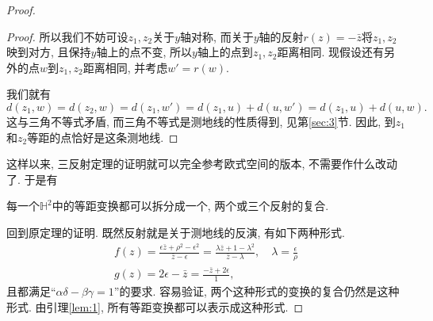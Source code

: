 \documentclass[./main.tex]{subfiles}
\begin{document}
\begin{proof}
\begin{proof}
    所以我们不妨可设\(z_1,z_2\)关于\(y\)轴对称, 而关于\(y\)轴的反射\(r(z)=-\bar z\)将\(z_1,z_2\)映到对方, 且保持\(y\)轴上的点不变, 所以\(y\)轴上的点到\(z_1,z_2\)距离相同. 现假设还有另外的点\(w\)到\(z_1,z_2\)距离相同, 并考虑\(w'=r(w)\).
    \begin{figure}[!ht]
        \centering
    \end{figure}

    我们就有
    \[
        d(z_1,w)=d(z_2,w)=d(z_1,w')=d(z_1,u)+d(u,w')=d(z_1,u)+d(u,w).
    \]
    这与三角不等式矛盾, 而三角不等式是测地线的性质得到, 见第\ref{sec:3}节. 因此, 到\(z_1\)和\(z_2\)等距的点恰好是这条测地线.
\end{proof}
这样以来, 三反射定理的证明就可以完全参考欧式空间的版本, 不需要作什么改动了. 于是有
\begin{lemma}\label{lem:1}
    每一个\(\mathbb{H}^2\)中的等距变换都可以拆分成一个, 两个或三个反射的复合.
\end{lemma}
回到原定理的证明. 既然反射就是关于测地线的反演, 有如下两种形式.
\begin{gather*}
    f(z)=\frac{\epsilon\bar z+\rho^2-\epsilon^2}{\bar z-\epsilon}=\frac{\lambda\bar z+1-\lambda^2}{\bar z-\lambda},\quad\lambda=\frac{\epsilon}{\rho}\\
    g(z)=2\epsilon-\bar z=\frac{-\bar z+2\epsilon}{1},
\end{gather*}
且都满足``\(\alpha\delta-\beta\gamma=1\)''的要求. 容易验证, 两个这种形式的变换的复合仍然是这种形式. 由引理\ref{lem:1}, 所有等距变换都可以表示成这种形式.
\end{proof}
\end{document}
